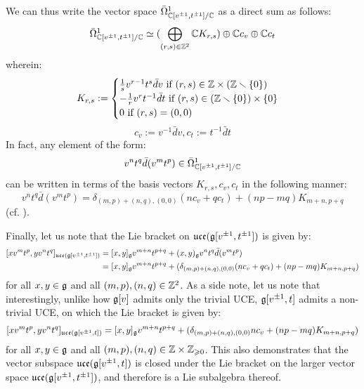 \begin{example}
            We can thus write the vector space $\bar{\Omega}^1_{\mathbb{C}[v^{\pm 1}, t^{\pm 1}]/\mathbb{C}}$ as a direct sum as follows:
                $$\bar{\Omega}^1_{\mathbb{C}[v^{\pm 1}, t^{\pm 1}]/\mathbb{C}} \simeq ( \bigoplus_{(r, s) \in \mathbb{Z}^2} \mathbb{C} K_{r, s}) \oplus \mathbb{C} c_v \oplus \mathbb{C} c_t$$
            wherein:
                $$
                    K_{r, s} :=
                    \begin{cases}
                        \text{$\frac1s v^{r - 1} t^s \bar{d}v$ if $(r, s) \in \Z \x (\Z \setminus \{0\})$}
                        \\
                        \text{$-\frac1r v^r t^{-1} \bar{d}t$ if $(r, s) \in (\Z \setminus \{0\}) \x \{0\}$}
                        \\
                        \text{$0$ if $(r, s) = (0, 0)$}
                    \end{cases}
                $$
                $$c_v := v^{-1} \bar{d}v, c_t := t^{-1} \bar{d}t$$
            In fact, any element of the form:
                $$v^n t^q \bar{d}(v^m t^p) \in \bar{\Omega}^1_{\mathbb{C}[v^{\pm 1}, t^{\pm 1}]/\mathbb{C}}$$
            can be written in terms of the basis vectors $K_{r, s}, c_v, c_t$ in the following manner:
                $$v^n t^q \bar{d}(v^m t^p) = \delta_{(m, p) + (n, q), (0, 0)} ( n c_v + q c_t ) + (np - mq) K_{m + n, p + q}$$
            (cf. \cite[p. 35]{wendlandt_formal_shift_operators_on_yangian_doubles}).

            Finally, let us note that the Lie bracket on $\mathfrak{uce}(\mathfrak{g}[v^{\pm 1}, t^{\pm 1}])$ is given by:
                $$
                    \begin{aligned}
                        [x v^m t^p, y v^n t^q]_{\uce(\g[v^{\pm 1}, t^{\pm 1}])} & = [x, y]_{\g} v^{m + n} t^{p + q} + (x, y)_{\g} v^n t^q \bar{d}(v^m t^p)
                        \\
                        & = [x, y]_{\g} v^{m + n} t^{p + q} + ( \delta_{(m, p) + (n, q), (0, 0)} ( n c_v + q c_t ) + (np - mq) K_{m + n, p + q} )
                    \end{aligned}
                $$
            for all $x, y \in \mathfrak{g}$ and all $(m, p), (n, q) \in \mathbb{Z}^2$. As a side note, let us note that interestingly, unlike how $\mathfrak{g}[v]$ admits only the trivial UCE, $\mathfrak{g}[v^{\pm 1}, t]$ admits a non-trivial UCE, on which the Lie bracket is given by:
                $$[x v^m t^p, y v^n t^q]_{\mathfrak{uce}(\mathfrak{g}[v^{\pm 1}, t])} = [x, y]_{\mathfrak{g}} v^{m + n} t^{p + q} + ( \delta_{(m, p) + (n, q), (0, 0)} n c_v + (np - mq) K_{m + n, p + q} )$$
            for all $x, y \in \mathfrak{g}$ and all $(m, p), (n, q) \in \Z \x \Z_{\geq 0}$. This also demonstrates that the vector subspace $\mathfrak{uce}(\mathfrak{g}[v^{\pm 1}, t])$ is closed under the Lie bracket on the larger vector space $\mathfrak{uce}(\mathfrak{g}[v^{\pm 1}, t^{\pm 1}])$, and therefore is a Lie subalgebra thereof.
        \end{example}
